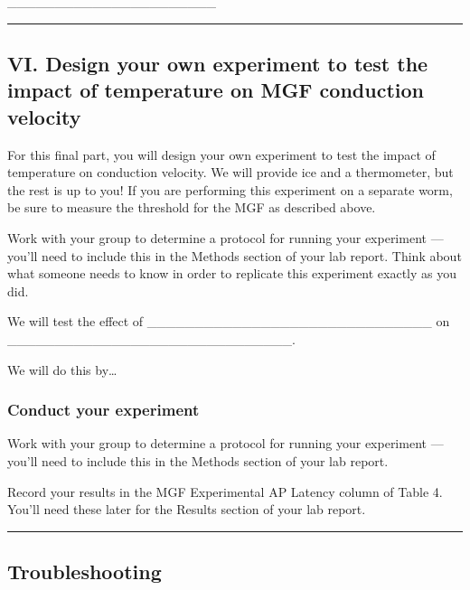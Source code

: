 \documentclass[letterpaper,10pt,english]{jupyterBook}
\begin{document}
\sphinxAtStartPar
{} \_\_\_\_\_\_\_\_\_\_\_\_\_\_\_\_\_\_\_\_\_\_


\bigskip\hrule\bigskip



\subsection{VI. Design your own experiment to test the impact of temperature on MGF conduction velocity}
\label{\detokenize{Earthworm:vi-design-your-own-experiment-to-test-the-impact-of-temperature-on-mgf-conduction-velocity}}
\sphinxAtStartPar
For this final part, you will design your own experiment to test the impact of temperature on conduction velocity. We will provide ice and a thermometer, but the rest is up to you! If you are performing this experiment on a separate worm, be sure to measure the threshold for the MGF as described above.

\sphinxAtStartPar
Work with your group to determine a protocol for running your experiment — you’ll need to include this in the Methods section of your lab report. Think about what someone needs to know in order to replicate this experiment exactly as you did.

\sphinxAtStartPar
We will test the effect of \_\_\_\_\_\_\_\_\_\_\_\_\_\_\_\_\_\_\_\_\_\_\_\_\_\_\_\_\_\_ on \_\_\_\_\_\_\_\_\_\_\_\_\_\_\_\_\_\_\_\_\_\_\_\_\_\_\_\_\_\_.

\sphinxAtStartPar
We will do this by…


\subsubsection{Conduct your experiment}
\label{\detokenize{Earthworm:conduct-your-experiment}}
\sphinxAtStartPar
Work with your group to determine a protocol for running your experiment — you’ll need to include this in the Methods section of your lab report.

\sphinxAtStartPar
Record your results in the MGF Experimental AP Latency column of Table 4. You’ll need these later for the Results section of your lab report.


\bigskip\hrule\bigskip



\subsection{Troubleshooting}
\label{\detokenize{Earthworm:troubleshooting}}
\end{document}
